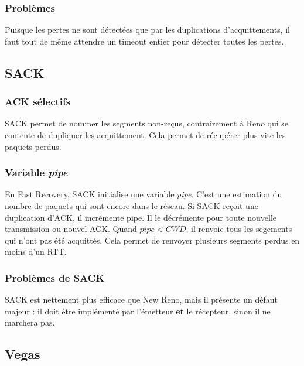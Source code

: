 \documentclass[	DIV=calc,%
							paper=a4,%
							fontsize=11pt,%
							twocolumn]{scrartcl}	 					%
\begin{document}
\subsubsection*{Problèmes}
Puisque les pertes ne sont détectées que par les duplications d'acquittements, il faut tout de même attendre un timeout entier pour détecter toutes les pertes. 
\subsection*{SACK}
\subsubsection*{ACK sélectifs}
SACK permet de nommer les segments non-reçus, contrairement à Reno qui se contente de dupliquer les acquittement. Cela permet de récupérer plus vite les paquets perdus.
\subsubsection*{Variable \textit{pipe}}
En Fast Recovery, SACK initialise une variable \textit{pipe}. C'est une estimation du nombre de paquets qui sont encore dans le réseau. Si SACK reçoit une duplication d'ACK, il incrémente pipe. Il le décrémente pour toute nouvelle transmission ou nouvel ACK. Quand $ pipe < CWD$, il renvoie tous les segements qui n'ont pas été acquittés. Cela permet de renvoyer plusieurs segments perdus en moins d'un RTT.
\subsubsection*{Problèmes de SACK}
SACK est nettement plus efficace que New Reno, mais il présente un défaut majeur : il doit être implémenté par l'émetteur \textbf{et} le récepteur, sinon il ne marchera pas.
\subsection*{Vegas}
\end{document}
